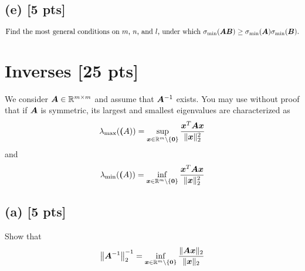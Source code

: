 \documentclass[twoside,10pt]{article}
\begin{document}
\subsection*{(e) [5 pts]}
  \begin{equation*}
    \text{Find the most general conditions on $m$, $n$, and $l$, under which } \sigma_{\mathrm{min}}\left(\mtx{A}\mtx{B}\right) \geq \sigma_{\mathrm{min}}\left(\mtx{A}\right) \sigma_{\mathrm{min}}\left(\mtx{B}\right).
  \end{equation*}

\section{Inverses [25 pts]}
We consider $\bm{A} \in \mathbb{R}^{m \times m}$ and assume that $\bm{A}^{-1}$ exists. 
You may use without proof that if $\bm{A}$ is symmetric, its largest and smallest eigenvalues are characterized as 
\begin{equation*}
   \lambda_{\mathrm{max}}\left(\mtx(A)\right) = \sup \limits_{\vct{x} \in \R^m \setminus \{\vct{0}\}} \frac{\vct{x}^T \mtx{A}\vct{x}}{\|\vct{x}\|_2^2}
\end{equation*}
and 
\begin{equation*}
   \lambda_{\mathrm{min}}\left(\mtx(A)\right) = \inf \limits_{\vct{x} \in \R^m \setminus \{\vct{0}\}} \frac{\vct{x}^T \mtx{A}\vct{x}}{\|\vct{x}\|_2^2}
\end{equation*}


\subsection*{(a) [5 pts]}
Show that 
\begin{equation}
  \left\|\mtx{A}^{-1}\right\|_2^{-1} = \inf \limits_{\vct{x} \in \R^m \setminus \{\vct{0}\}} \frac{\|\mtx{A}\vct{x}\|_2}{\|\vct{x}\|_2}
\end{equation}
\end{document}
